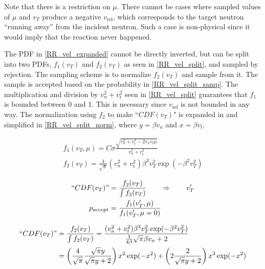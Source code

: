 Note that there is a restriction on $\mu$.  There cannot be cases where sampled values of $\mu$ and $v_T$ produce a negative $v_\mathrm{rel}$, which corresponds to the target neutron ``running away'' from the incident neutron.  Such a case is non-physical since it would imply that the reaction never happened.  %

The PDF in \eqref{RR_vel_expanded} cannot be directly inverted, but can be split into two PDFs, $f_1(v_T)$ and $f_2(v_T)$ as seen in \eqref{RR_vel_split}, and sampled by rejection.  The sampling scheme is to normalize $f_2(v_T)$ and sample from it.  The sample is accepted based on the probability in \eqref{RR_vel_split_samp}\cite{openmc}.
The multiplication and division by $v_n^2+v_t^2$ seen in \eqref{RR_vel_split} guarantees that $f_1$ is bounded between 0 and 1.  This is necessary since $v_\mathrm{rel}$ is not bounded in any way.  The normalization using $f_2$ to make ``$CDF(v_T)$" is expanded in and simplified in \eqref{RR_vel_split_norm}, where $y=\beta v_n$ and $x=\beta v_t$.

\begin{equation}
\label{RR_vel_split}
\begin{gathered}
f_1(v_T,\mu) = C \sigma  \frac{\sqrt{v_n^2+v_t^2-2 v_n v_t \mu}}{v_n^2+v_t^2}\\
f_2(v_T) =  \frac{4}{\sqrt{\pi}} (v_n^2+v_t^2) \beta^3 v_T^2  \exp ( -\beta^2  v_T^2 )
\end{gathered}
\end{equation}

\begin{equation}
\label{RR_vel_split_samp}
\begin{split}
``CDF(v_T)" &= \frac{f_2(v_T)}{\int f_2(v_T)} \qquad \Rightarrow \qquad v_T^\prime  \\
p_\mathrm{accept} &= \frac{f_1(v_T^\prime,\mu)}{ f_1(v_T^\prime,\mu=0)}
\end{split}
\end{equation}

\begin{equation}
\label{RR_vel_split_norm}
\begin{split}
``CDF(v_T)" &=  \frac{f_2(v_T)}{\int f_2(v_T)} = \frac{  (v_n^2+v_t^2) \beta^3 v_T^2  \exp ( -\beta^2  v_T^2 ) }{ \frac{1}{4\beta} \sqrt{\pi} \beta v_n +2 } \\
&= \left( \frac{4}{\sqrt{\pi}}  \frac{\sqrt{\pi}y}{\sqrt{\pi}y+2} \right) x^2 \exp(-x^2)  + \left( 2  \frac{2}{\sqrt{\pi}y+2} \right) x^3 \exp(-x^2) \\
\end{split}
\end{equation}

